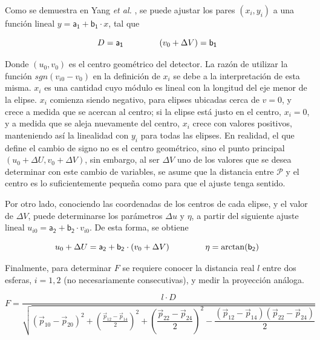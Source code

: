 Como se demuestra en Yang \textit{et al.} \cite{Yang2006}, se puede ajustar los pares $(x_i,y_i)$ a
una función lineal $y = \mathsf{a_1} + \mathsf{b_1}\cdot x$, tal que 

\begin{equation}
    D = \mathsf{a_1} \hspace{15mm} (v_0 + \Delta V) = \mathsf{b_1}
    \label{eq:Delta_V_D}
\end{equation}

Donde $(u_0, v_0)$ es el centro
geométrico del detector. La razón de utilizar la función $sgn(v_{i0}-v_0)$ en la definición
de $x_i$ se debe a la interpretación de esta misma. $x_i$ es una cantidad cuyo módulo es lineal con
la longitud del eje menor de la elipse. $x_i$ comienza siendo negativo, para elipses ubicadas cerca de
$v=0$, y crece a medida que se acercan al centro; si la elipse está justo en el centro,
$x_i=0$, y a medida que se aleja nuevamente del centro, $x_i$ crece con valores positivos,
manteniendo así la linealidad con $y_i$ para todas las elipses. En realidad, el que define
el cambio de signo no es el centro geométrico, sino el punto principal $(u_0 +\Delta U,
v_0 + \Delta V)$, sin embargo, al ser $\Delta V$ uno de los valores que se desea determinar
con este cambio de variables, se asume que la distancia entre $\mathcal{P}$ y el centro
es lo suficientemente pequeña como para que el ajuste tenga sentido.

Por otro lado, conociendo las coordenadas de los centros de cada elipse, y el valor de
$\Delta V$, puede determinarse los parámetros $\Delta u$ y $\eta$, a partir del siguiente
ajuste lineal $u_{i0} = \mathsf{a_2} + \mathsf{b_2}\cdot v_{i0}$. De esta forma, se obtiene

\begin{equation}
    u_0 + \Delta U = \mathsf{a_2} + \mathsf{b_2}\cdot (v_0 + \Delta V)
    \hspace{15mm}
    \eta = \arctan(\mathsf{b_2})
    \label{eq:delta_u_eta}
\end{equation}

Finalmente, para determinar $F$ se requiere conocer la distancia real $l$ entre dos esferas,
$i=1,2$ (no necesariamente consecutivas), y medir la proyección análoga.

\begin{equation}
    F = \dfrac{l\cdot D}{\sqrt{ (\vec{p}_{10}-\vec{p}_{20})^2 + \left(\frac{\vec{p}_{12} - \vec{p}_{14}}{2}\right)^2
    + \left(\dfrac{\vec{p}_{22} - \vec{p}_{24}}{2}\right)^2 - \dfrac{(\vec{p}_{12} - \vec{p}_{14})(\vec{p}_{22} - \vec{p}_{24})}{2} }}
    \label{eq:F}
\end{equation}


